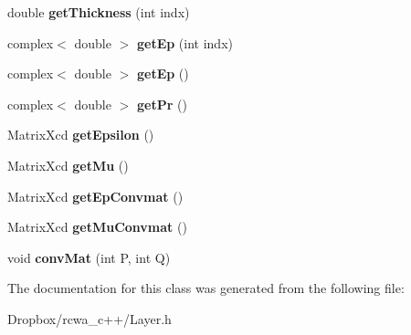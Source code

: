 \begin{DoxyCompactItemize}
\item 
double {\bfseries get\+Thickness} (int indx)\hypertarget{class_layer_a1fc571ce3f1369c89d5fe9fe552f8ad4}{}\label{class_layer_a1fc571ce3f1369c89d5fe9fe552f8ad4}

\item 
complex$<$ double $>$ {\bfseries get\+Ep} (int indx)\hypertarget{class_layer_aa37a9dc06af177c501cfa7a367469e33}{}\label{class_layer_aa37a9dc06af177c501cfa7a367469e33}

\item 
complex$<$ double $>$ {\bfseries get\+Ep} ()\hypertarget{class_layer_aeb7f8041c787f25da09ae1489cf53936}{}\label{class_layer_aeb7f8041c787f25da09ae1489cf53936}

\item 
complex$<$ double $>$ {\bfseries get\+Pr} ()\hypertarget{class_layer_a169de55458561de6f02b6f4c82c785ac}{}\label{class_layer_a169de55458561de6f02b6f4c82c785ac}

\item 
Matrix\+Xcd {\bfseries get\+Epsilon} ()\hypertarget{class_layer_ab69b32792898315139301970c004fbd3}{}\label{class_layer_ab69b32792898315139301970c004fbd3}

\item 
Matrix\+Xcd {\bfseries get\+Mu} ()\hypertarget{class_layer_a9bf6c91101c59ec6562dc8a3a688ae62}{}\label{class_layer_a9bf6c91101c59ec6562dc8a3a688ae62}

\item 
Matrix\+Xcd {\bfseries get\+Ep\+Convmat} ()\hypertarget{class_layer_ac488d5921f1bf82ed3d4c784d06de6b6}{}\label{class_layer_ac488d5921f1bf82ed3d4c784d06de6b6}

\item 
Matrix\+Xcd {\bfseries get\+Mu\+Convmat} ()\hypertarget{class_layer_a347fbabbe301069144108f5fdd941434}{}\label{class_layer_a347fbabbe301069144108f5fdd941434}

\item 
void {\bfseries conv\+Mat} (int P, int Q)\hypertarget{class_layer_a8acc47efec91e45b5b81f693ad257a96}{}\label{class_layer_a8acc47efec91e45b5b81f693ad257a96}

\end{DoxyCompactItemize}


The documentation for this class was generated from the following file\+:\begin{DoxyCompactItemize}
\item 
Dropbox/rcwa\+\_\+c++/Layer.\+h\end{DoxyCompactItemize}
